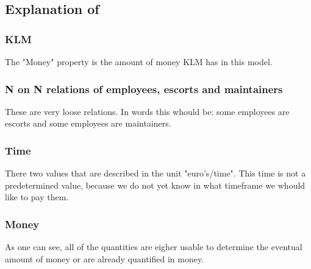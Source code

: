 \documentclass[a4paper, 12pt, notitlepage]{report}
\begin{document}
\subsection{Explanation of}
\subsubsection{KLM}
The "Money" property is the amount of money KLM has in this model. 

\subsubsection{N on N relations of employees, escorts and maintainers}
These are very loose relations. In words this whould be: some employees are escorts and some employees are maintainers. 

\subsubsection{Time}
There two values that are described in the unit "euro's/time". This time is not a predetermined value, because we do not yet know in what timeframe we whould like to pay them. 

\subsubsection{Money}
As one can see, all of the quantities are eigher usable to determine the eventual amount of money or are already quantified in money.

\end{document}
